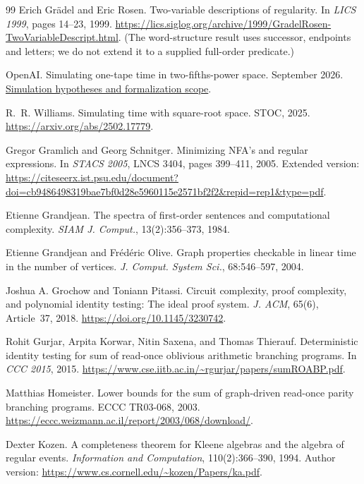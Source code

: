 \documentclass[11pt]{article}
\theoremstyle{definition}
\theoremstyle{remark}
\begin{document}
\begin{thebibliography}{99}
 Erich Gr\"adel and Eric Rosen.
\newblock Two-variable descriptions of regularity.
\newblock In \emph{LICS 1999}, pages 14--23, 1999.
\newblock \url{https://lics.siglog.org/archive/1999/GradelRosen-TwoVariableDescript.html}.
\newblock (The word-structure result uses successor, endpoints and
letters; we do not extend it to a supplied full-order predicate.)

 OpenAI. Simulating one-tape time in two-fifths-power
space. September 2026.
\href{https://github.com/openai/math/blob/3344da59991ed94f9ba711217b29c1d760badfa6/lean/docs/137.md}{Simulation hypotheses and formalization scope}.

 R.~R. Williams. Simulating time with square-root space.
\newblock STOC, 2025. \url{https://arxiv.org/abs/2502.17779}.

 Gregor Gramlich and Georg Schnitger.
\newblock Minimizing NFA's and regular expressions.
\newblock In \emph{STACS 2005}, LNCS 3404, pages 399--411, 2005.
\newblock Extended version:
\url{https://citeseerx.ist.psu.edu/document?doi=cb9486498319bae7bf0d28e5960115e2571bf2f2&repid=rep1&type=pdf}.

 Etienne Grandjean.
\newblock The spectra of first-order sentences and computational
complexity.
\newblock \emph{SIAM J. Comput.}, 13(2):356--373, 1984.

 Etienne Grandjean and Fr\'ed\'eric Olive.
\newblock Graph properties checkable in linear time in the number of
vertices.
\newblock \emph{J. Comput. System Sci.}, 68:546--597, 2004.

 Joshua A. Grochow and Toniann Pitassi.
\newblock Circuit complexity, proof complexity, and polynomial identity
testing: The ideal proof system.
\newblock \emph{J. ACM}, 65(6), Article~37, 2018.
\newblock \url{https://doi.org/10.1145/3230742}.

 Rohit Gurjar, Arpita Korwar, Nitin Saxena, and
Thomas Thierauf.
\newblock Deterministic identity testing for sum of read-once
oblivious arithmetic branching programs.
\newblock In \emph{CCC 2015}, 2015.
\newblock \url{https://www.cse.iitb.ac.in/~rgurjar/papers/sumROABP.pdf}.

 Matthias Homeister.
\newblock Lower bounds for the sum of graph-driven read-once parity
branching programs.
\newblock ECCC TR03-068, 2003.
\newblock \url{https://eccc.weizmann.ac.il/report/2003/068/download/}.

 Dexter Kozen.
\newblock A completeness theorem for Kleene algebras and the algebra of
regular events.
\newblock \emph{Information and Computation}, 110(2):366--390, 1994.
\newblock Author version: \url{https://www.cs.cornell.edu/~kozen/Papers/ka.pdf}.


\end{thebibliography}
\end{document}
